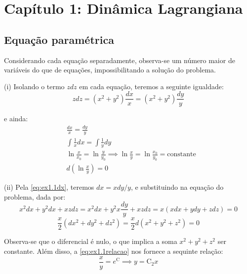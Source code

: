 \chapter{Capítulo 1: Dinâmica Lagrangiana}\label{cap1}
\section{Equação paramétrica}
    
        Considerando cada equação separadamente, observa-se um número maior de variáveis do que de equações, impossibilitando a solução do problema.
        
    (i) Isolando o termo $zdz$ em cada equação, teremos a seguinte igualdade:
        \begin{equation} \label{eq:ex1.1}
            zdz = (x^2+y^2)\frac{dx}{x}=(x^2+y^2)\frac{dy}{y}
        \end{equation}

        e ainda:
        \begin{align}
            & \frac{dx}{x} = \frac{dy}{y} \label{eq:ex1.1dx} \\
            & \int \frac{1}{x}dx = \int \frac{1}{y}dy \\
            & \ln{\frac{x}{x_0}} = \ln{\frac{y}{y_0}} \implies \ln{\frac{x}{y}} = \ln{\frac{x_0}{y_0}} = \mathrm{constante} \label{eq:ex1.1relacao}\\
            & d\left ( \ln{\frac{x}{y}} \right ) = 0
        \end{align}

(ii) Pela \eqref{eq:ex1.1dx}, teremos $dx=x dy/y$, e substituindo na equação do problema, dada por:
    \begin{equation} \nonumber
        x^2dx+y^2dx+xz dz = x^2dx+y^2x\frac{dy}{y}+xz dz = x \left (x dx+y dy+z dz \right ) = 0
    \end{equation}
    \begin{equation}
        \frac{x}{2}\left ( dx^2+dy^2+dz^2 \right ) = \frac{x}{2} d\left ( x^2+y^2+z^2 \right ) = 0
    \end{equation}

Observa-se que o diferencial é nulo, o que implica a soma $x^2+y^2+z^2$ ser constante. Além disso, a \eqref{eq:ex1.1relacao} nos fornece a sequinte relação:
\begin{equation}
    \frac{x}{y}=e^\mathrm{C} \implies y=\mathrm{C_2}x
\end{equation}
    



